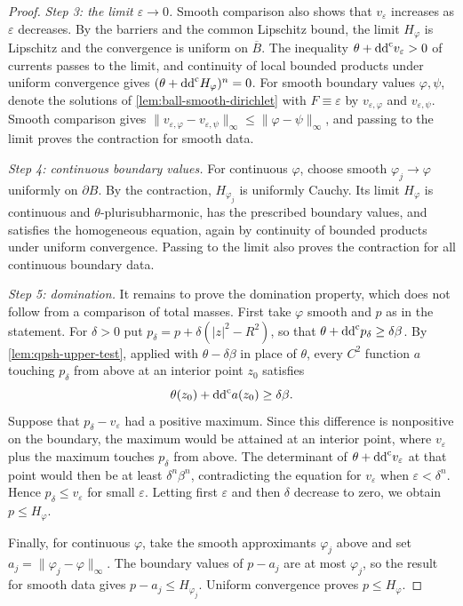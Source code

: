 \begin{proof}
\emph{Step 3: the limit $\varepsilon\to0$.} Smooth comparison also shows that $v_\varepsilon$ increases as $\varepsilon$ decreases. By the barriers and the common Lipschitz bound, the limit $H_\varphi$ is Lipschitz and the convergence is uniform on $\overline B$. The inequality $\theta+\mathrm{dd}^{\mathrm{c}} v_\varepsilon>0$ of currents passes to the limit, and continuity of local bounded products under uniform convergence gives $(\theta+\mathrm{dd}^{\mathrm{c}} H_\varphi)^n=0$. For smooth boundary values $\varphi,\psi$, denote the solutions of \cref{lem:ball-smooth-dirichlet} with $F\equiv\varepsilon$ by $v_{\varepsilon,\varphi}$ and $v_{\varepsilon,\psi}$. Smooth comparison gives $\|v_{\varepsilon,\varphi}-v_{\varepsilon,\psi}\|_\infty\leq\|\varphi-\psi\|_\infty$, and passing to the limit proves the contraction for smooth data.

\emph{Step 4: continuous boundary values.} For continuous $\varphi$, choose smooth $\varphi_j\to\varphi$ uniformly on $\partial B$. By the contraction, $H_{\varphi_j}$ is uniformly Cauchy. Its limit $H_\varphi$ is continuous and $\theta$-plurisubharmonic, has the prescribed boundary values, and satisfies the homogeneous equation, again by continuity of bounded products under uniform convergence. Passing to the limit also proves the contraction for all continuous boundary data.

\emph{Step 5: domination.} It remains to prove the domination property, which does not follow from a comparison of total masses. First take $\varphi$ smooth and $p$ as in the statement. For $\delta>0$ put $p_\delta=p+\delta(|z|^2-R^2)$, so that $\theta+\mathrm{dd}^{\mathrm{c}} p_\delta\geq\delta\beta$. By \cref{lem:qpsh-upper-test}, applied with $\theta-\delta\beta$ in place of $\theta$, every $C^2$ function $a$ touching $p_\delta$ from above at an interior point $z_0$ satisfies
\[
 \theta(z_0)+\mathrm{dd}^{\mathrm{c}} a(z_0)\geq\delta\beta.
\]
Suppose that $p_\delta-v_\varepsilon$ had a positive maximum. Since this difference is nonpositive on the boundary, the maximum would be attained at an interior point, where $v_\varepsilon$ plus the maximum touches $p_\delta$ from above. The determinant of $\theta+\mathrm{dd}^{\mathrm{c}} v_\varepsilon$ at that point would then be at least $\delta^n\beta^n$, contradicting the equation for $v_\varepsilon$ when $\varepsilon<\delta^n$. Hence $p_\delta\leq v_\varepsilon$ for small $\varepsilon$. Letting first $\varepsilon$ and then $\delta$ decrease to zero, we obtain $p\leq H_\varphi$.

Finally, for continuous $\varphi$, take the smooth approximants $\varphi_j$ above and set $a_j=\|\varphi_j-\varphi\|_\infty$. The boundary values of $p-a_j$ are at most $\varphi_j$, so the result for smooth data gives $p-a_j\leq H_{\varphi_j}$. Uniform convergence proves $p\leq H_\varphi$.
\end{proof}
